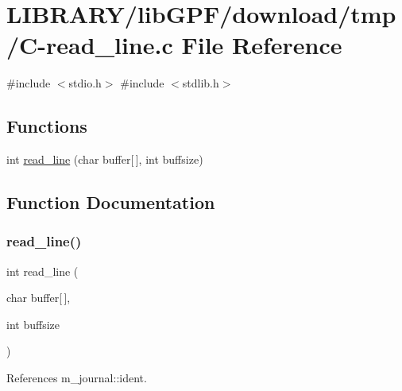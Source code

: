 \hypertarget{C-read__line_8c}{}\section{L\+I\+B\+R\+A\+R\+Y/lib\+G\+P\+F/download/tmp/\+C-\/read\+\_\+line.c File Reference}
\label{C-read__line_8c}
{\ttfamily \#include $<$stdio.\+h$>$}\newline
{\ttfamily \#include $<$stdlib.\+h$>$}\newline
\subsection*{Functions}
\begin{DoxyCompactItemize}
\item 
int \hyperlink{C-read__line_8c_aa70fff09f4f198b81612596f3c466af1}{read\+\_\+line} (char buffer\mbox{[}$\,$\mbox{]}, int buffsize)
\end{DoxyCompactItemize}


\subsection{Function Documentation}
\mbox{\label{C-read__line_8c_aa70fff09f4f198b81612596f3c466af1}} 
\subsubsection{\texorpdfstring{read\+\_\+line()}{read\_line()}}
{\footnotesize\ttfamily int read\+\_\+line (\begin{DoxyParamCaption}\item[{char}]{buffer\mbox{[}$\,$\mbox{]},  }\item[{int}]{buffsize }\end{DoxyParamCaption})}



References m\+\_\+journal\+::ident.

